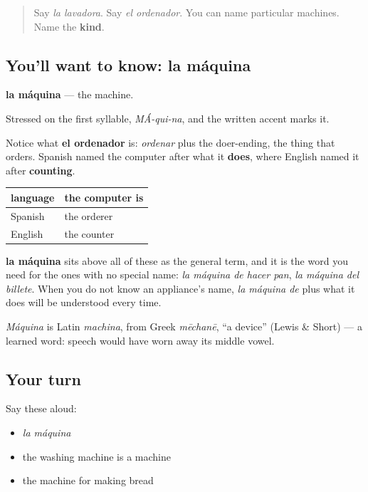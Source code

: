 \begin{quote}
Say \emph{la lavadora}. Say \emph{el ordenador}. You can name particular machines. Name the \textbf{kind}.
\end{quote}

\subsection*{You'll want to know: la máquina}
\textbf{la máquina} — the machine.

Stressed on the first syllable, \emph{MÁ-qui-na}, and the written accent marks it.

\begin{cousinweb}
Notice what \textbf{el ordenador} is: \emph{ordenar} plus the doer-ending, the thing that orders. Spanish named the computer after what it \textbf{does}, where English named it after \textbf{counting}.

\noindent
\begin{tabularx}{\linewidth}{@{}>{\raggedright\arraybackslash}X>{\raggedright\arraybackslash}X@{}}
\toprule
\textbf{language} & \textbf{the computer is} \\
\midrule
Spanish & the orderer \\
English & the counter \\
\bottomrule
\end{tabularx}

\textbf{la máquina} sits above all of these as the general term, and it is the word you need for the ones with no special name: \emph{la máquina de hacer pan}, \emph{la máquina del billete}. When you do not know an appliance's name, \emph{la máquina de} plus what it does will be understood every time.

\emph{Máquina} is Latin \emph{machina}, from Greek \emph{mēchanē}, \textquotedblleft{}a device\textquotedblright{} (Lewis \& Short) — a learned word: speech would have worn away its middle vowel.
\end{cousinweb}

\subsection*{Your turn}
Say these aloud:

\begin{itemize}
\raggedright
  \item \emph{la máquina}
  \item the washing machine is a machine
  \item the machine for making bread
\end{itemize}

